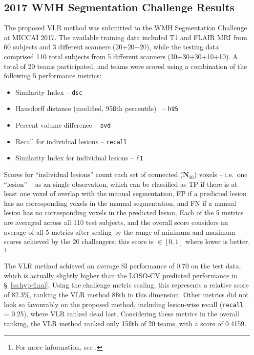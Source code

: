 \subsection{2017 WMH Segmentation Challenge Results}\label{ss:exp-wmhseg17}
The proposed VLR method was submitted to the WMH Segmentation Challenge at MICCAI 2017.
The available training data included T1 and FLAIR MRI
from 60 subjects and 3 different scanners (20+20+20),
while the testing data comprised
110 total subjects from 5 different scanners (30+30+30+10+10).
A total of 20 teams participated,
and teams were scored using a combination of the following 5 performance metrics:
\begin{itemize}[itemsep=0pt,topsep=0pt]
  \item Similarity Index -- \texttt{dsc}
  \item Hausdorff distance (modified, 95\ss{th} percentile)~\cite{Dubuisson1994} -- \texttt{h95}
  \item Percent volume difference -- \texttt{avd}
  \item Recall for individual lesions -- \texttt{recall}
  \item Similarity Index for individual lesions -- \texttt{f1}
\end{itemize}
Scores for ``individual lesions''
count each set of connected ($\mathbf{N}_{26}$) voxels
-- i.e.\ one ``lesion'' -- as an single observation,
which can be classified as
TP if there is at least one voxel of overlap with the manual segmentation,
FP if a predicted lesion has no corresponding voxels in the manual segmentation, and
FN if a manual lesion has no corresponding voxels in the predicted lesion.
Each of the 5 metrics are averaged across all 110 test subjects,
and the overall score considers an average of all 5 metrics
after scaling by the range of minimum and maximum scores achieved by the 20 challengers;
this score is $\in [0,1]$ where lower is better.%
\footnote{For more information, see .}
\par
The VLR method achieved an average SI performance of 0.70 on the test data,
which is actually slightly higher than the LOSO-CV predicted performance in \S~\ref{ss:hyp-final}.
Using the challenge metric scaling, this represents a relative score of 82.3\%,
ranking the VLR method 8\ss{th} in this dimension.
Other metrics did not look so favourably on the proposed method,
including lesion-wise recall (\texttt{recall} = 0.25), where VLR ranked dead last.
Considering these metrics in the overall ranking,
the VLR method ranked only 15\ss{th} of 20 teams, with a score of 0.4159.
